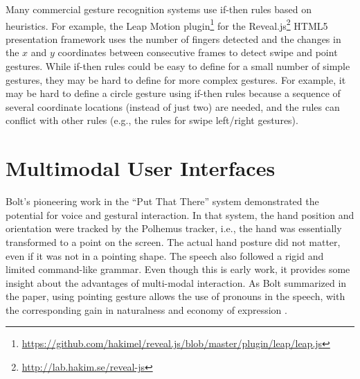 Many commercial gesture recognition systems use if-then rules
based on heuristics. For example, the Leap Motion plugin\footnote{\url{https://github.com/hakimel/reveal.js/blob/master/plugin/leap/leap.js}}
for the Reveal.js\footnote{\url{http://lab.hakim.se/reveal-js}} HTML5
presentation framework uses the number of fingers detected and the changes in the $x$ and $y$ coordinates between consecutive
frames to detect swipe and point gestures. While if-then rules could be easy to define for
a small number of simple gestures, they may be hard to define for more complex
gestures.
For example, it may be hard to define a circle gesture using if-then rules
because a sequence of several coordinate locations (instead of just two) are
needed, and the rules can conflict with other rules (e.g., the rules for swipe
left/right gestures).

% 

\section{Multimodal User Interfaces}
Bolt's pioneering work in the ``Put That There'' system \cite{Bolt80} 
demonstrated the potential for voice and gestural interaction.  In that system, 
the hand position and orientation were tracked by the Polhemus tracker, i.e.,
the hand was essentially transformed to a point on the screen. The actual hand 
posture did not matter, even if it was not in a pointing shape. The speech also 
followed a rigid and limited command-like grammar. Even though this is early 
work, it provides some insight about the advantages of multi-modal interaction. 
As Bolt summarized in the paper, using pointing gesture allows the use of 
pronouns in the speech, with the corresponding gain in naturalness and economy 
of expression \cite{Bolt80}.


